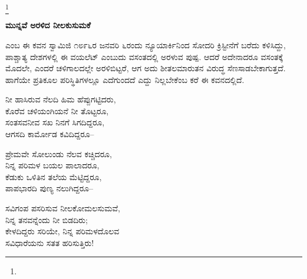 \protect\footnote{}

\begin{myquote}
\end{myquote}

\begin{center}
\textbf{ಮುನ್ನವೆ ಅರಳಿದ ನೀಲಕುಸುಮಕೆ}
\end{center}

 ಎಂಬ ಈ ಕವನ ಸ್ವಾಮಿಜಿ ೧೮೯೬ರ ಜನವರಿ ೬ರಂದು ನ್ಯೂಯಾರ್ಕಿನಿಂದ ಸೋದರಿ ಕ್ರಿಸ್ಟೀನೆಗೆ ಬರೆದು ಕಳಿಸಿದ್ದು, ಪಾಶ್ಚಾತ್ಯ ದೇಶಗಳಲ್ಲಿ ಈ ವಯಲೆಟ್ ಎಂಬುದು ವಸಂತದಲ್ಲಿ ಅರಳುವ ಪುಷ್ಪ. ಆದರೆ ಅದೇನಾದರೂ ವಸಂತಕ್ಕೆ ಮೊದಲೇ, ಎಂದರೆ ಚಳಿಗಾಲದಲ್ಲೇ ಅರಳಿಬಿಟ್ಟರೆ, ಆಗ ಅದು ಶೀತಲಮಾರುತನ ವಿರುದ್ಧ ಸೆಣಸಾಡಬೇಕಾಗುತ್ತದೆ. ಹಾಗೆಯೇ ಪ್ರತಿಕೂಲ ಪರಿಸ್ಥಿತಿಗಳಲ್ಲೂ ಎದೆಗುಂದದೆ ಎದ್ದು ನಿಲ್ಲಬೇಕೆಂಬ ಕರೆ ಈ ಕವನದಲ್ಲಿದೆ.

\begin{myquote}
ನೀ ಹಾಸಿರುವ ನೆಲದಿ ಹಿಮ ಹೆಪ್ಪುಗಟ್ಟಿದರು,\\ಕೊರೆವ ಚಳಿಯಂಗಿಯನೆ ನೀ ತೊಟ್ಟರೂ,\\ಸಂತಸವನೀವ ಸಖ ನಿನಗೆ ಸಿಗದಿದ್ದರೂ,\\ಆಗಸದಿ ಕಾರ್ಮೋಡ ಕವಿದಿದ್ದರೂ–
\end{myquote}

\begin{myquote}
ಪ್ರೇಮವೇ ಸೋಲುಂಡು ನೆಲವ ಕಚ್ಚಿದರೂ,\\ನಿನ್ನ ಪರಿಮಳ ಬಯಲ ಪಾಲಾದರೂ,\\ಕೆಡುಕು ಒಳಿತಿನ ತಲೆಯ ಮೆಟ್ಟಿದ್ದರೂ,\\ಪಾಪಭಾರದಿ ಪುಣ್ಯ ನಲುಗಿದ್ದರೂ–
\end{myquote}

\begin{myquote}
ಸವಿಗಂಪ ಪಸರಿಸುವ ನೀಲಕೋಮಲಸುಮವೆ,\\ನಿನ್ನ ತನವನ್ನೆಂದು ನೀ ಬಿಡದಿರು;\\ಕೇಳದಿದ್ದರು ಸರಿಯೇ, ನಿನ್ನ ಪರಿಮಳದೊಲವ\\ಸವಿಧಾರೆಯನು ಸತತ ಹರಿಸುತ್ತಿರು!
\end{myquote}

